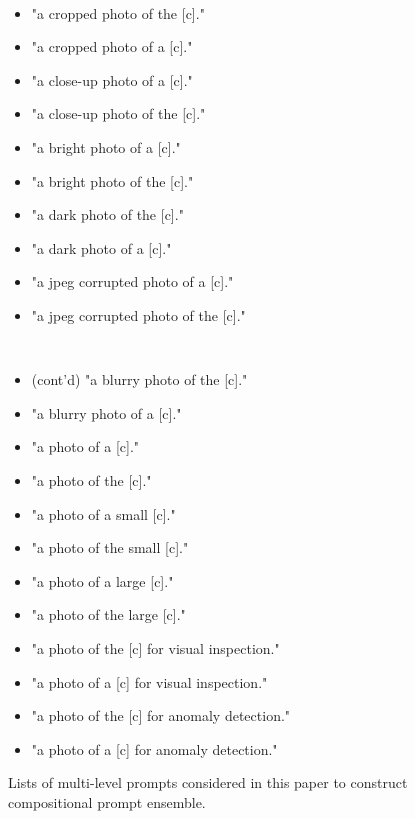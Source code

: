\begin{figure*}
\begin{minipage}[t]{0.33\linewidth}
{\tt \small
\begin{itemize}
\item "a cropped photo of the [c]."
\item "a cropped photo of a [c]."
\item "a close-up photo of a [c]."
\item "a close-up photo of the [c]."
\item "a bright photo of a [c]." 
\item "a bright photo of the [c]."
\item "a dark photo of the [c]."
\item "a dark photo of a [c]."
\item "a jpeg corrupted photo of a [c]."
\item "a jpeg corrupted photo of the [c]."
\end{itemize}
}
\end{minipage}
\begin{minipage}[t]{0.33\linewidth}
{\tt \small
\begin{itemize}
\item {\rm (cont'd)} "a blurry photo of the [c]."
\item "a blurry photo of a [c]."
\item "a photo of a [c]."
\item "a photo of the [c]."
\item "a photo of a small [c]."
\item "a photo of the small [c]."
\item "a photo of a large [c]."
\item "a photo of the large [c]."
\item "a photo of the [c] for visual inspection."
\item "a photo of a [c] for visual inspection."
\item "a photo of the [c] for anomaly detection."
\item "a photo of a [c] for anomaly detection."
\end{itemize}
}
\end{minipage}
\caption{Lists of multi-level prompts considered in this paper to construct compositional prompt ensemble.}
\label{fig:comp_prompt}
\end{figure*}

